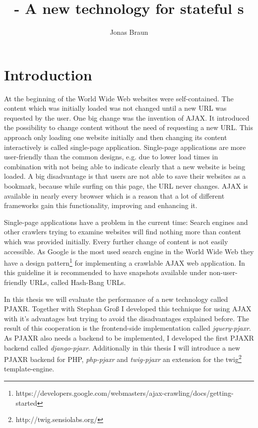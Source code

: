 \documentclass[f,bachelor,binding,twoside,palatino]{WeSTthesis}
\author{Jonas Braun}
\title{\pjaxr{} - A new technology for stateful \singlePageApplication{}s}
\def \ajax {AJAX}
\def \pjaxr {PJAXR}
\def \jqueryPjaxr {jquery-pjaxr}
\def \djangoPjaxr {django-pjaxr}
\def \phpPjaxr {php-pjaxr}
\def \twigPjaxr {twig-pjaxr}
\def \twig {twig}
\def \singlePageApplication {single-page application}
\def \SinglePageApplication {Single-page application}
\begin{document}

\maketitle
{}

\tableofcontents

\varclearpage



\newcommand\todo[1]{\textcolor{red}{#1}}

\section{Introduction}
At the beginning of the World Wide Web websites were self-contained. The content which was initially loaded was not changed until a new URL was requested by the user.
One big change was the invention of \ajax{}. It introduced the possibility to change content without the need of requesting a new URL.
This approach only loading one website initially and then changing its content interactively is called \singlePageApplication{}.
\SinglePageApplication{}s are more user-friendly than the common designs, e.g. due to lower load times in combination with not being able to indicate clearly that a new website is being loaded.
A big disadvantage is that users are not able to save their websites as a bookmark, because while surfing on this page, the URL never changes.
\ajax{} is available in nearly every browser which is a reason that a lot of different frameworks gain this functionality, improving and enhancing it.

\SinglePageApplication{}s have a problem in the current time: Search engines and other crawlers trying to examine websites will find nothing more than content which was provided initially. Every further change of content is not easily accessible.
As Google is the most used search engine in the World Wide Web they have a design pattern\footnote{https://developers.google.com/webmasters/ajax-crawling/docs/getting-started} for implementing a crawlable \ajax{} web application. 
In this guideline it is recommended to have snapshots available under non-user-friendly URLs, called Hash-Bang URLs.

In this thesis we will evaluate the performance of a new technology called \pjaxr{}. 
Together with Stephan Gro{\ss} I developed this technique for using \ajax{} with it's advantages but trying to avoid the disadvantages explained before.
The result of this cooperation is the frontend-side implementation called \emph{\jqueryPjaxr{}}.
As \pjaxr{} also needs a backend to be implemented, I developed the first \pjaxr{} backend called \emph{\djangoPjaxr{}}.
Additionally in this thesis I will introduce a new \pjaxr{} backend for PHP, \emph{\phpPjaxr{}} and \emph{\twigPjaxr{}} an extension for the \twig{}\footnote{http://twig.sensiolabs.org/} template-engine.
\end{document}
